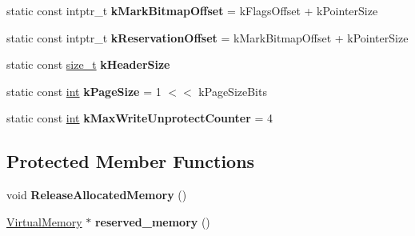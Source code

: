 \begin{DoxyCompactItemize}
static const intptr\+\_\+t {\bfseries k\+Mark\+Bitmap\+Offset} = k\+Flags\+Offset + k\+Pointer\+Size
\item 
\mbox{\label{classv8_1_1internal_1_1MemoryChunk_a88d58635dbe42c3272da3100183d689a}} 
static const intptr\+\_\+t {\bfseries k\+Reservation\+Offset} = k\+Mark\+Bitmap\+Offset + k\+Pointer\+Size
\item 
\mbox{\label{classv8_1_1internal_1_1MemoryChunk_a9d854e2a69023012cd6c1f2a811ed3a2}} 
static const \mbox{\hyperlink{classsize__t}{size\+\_\+t}} {\bfseries k\+Header\+Size}
\item 
\mbox{\label{classv8_1_1internal_1_1MemoryChunk_ad3fb50a7edf5e288244370fa3b2a3da4}} 
static const \mbox{\hyperlink{classint}{int}} {\bfseries k\+Page\+Size} = 1 $<$$<$ k\+Page\+Size\+Bits
\item 
\mbox{\label{classv8_1_1internal_1_1MemoryChunk_a3e05bfd631fcb60af3db5a6510a32391}} 
static const \mbox{\hyperlink{classint}{int}} {\bfseries k\+Max\+Write\+Unprotect\+Counter} = 4
\end{DoxyCompactItemize}
\subsection*{Protected Member Functions}
\begin{DoxyCompactItemize}
\item 
\mbox{\label{classv8_1_1internal_1_1MemoryChunk_a3a18c35d669c988d169bc0fabad4230a}} 
void {\bfseries Release\+Allocated\+Memory} ()
\item 
\mbox{\label{classv8_1_1internal_1_1MemoryChunk_a7b17b7fe9cb3486dbf4fc49dadb5992a}} 
\mbox{\hyperlink{classv8_1_1internal_1_1VirtualMemory}{Virtual\+Memory}} $\ast$ {\bfseries reserved\+\_\+memory} ()
\end{DoxyCompactItemize}

